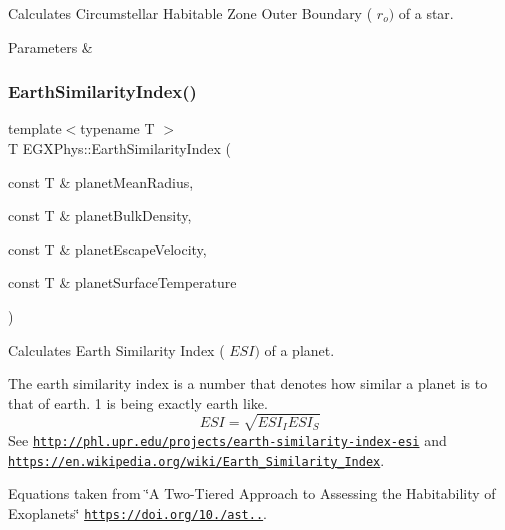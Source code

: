 Calculates Circumstellar Habitable Zone Outer Boundary ( $r_o)$ of a star. 


\begin{DoxyParams}{Parameters}
{\em } & \\
\hline
\end{DoxyParams}
\mbox{\label{group___astrophysics_ga4b86397b1c839c49ac599d49fda207d4}} 
\subsubsection{\texorpdfstring{Earth\+Similarity\+Index()}{EarthSimilarityIndex()}}
{\footnotesize\ttfamily template$<$typename T $>$ \\
T E\+G\+X\+Phys\+::\+Earth\+Similarity\+Index (\begin{DoxyParamCaption}\item[{const T \&}]{planet\+Mean\+Radius,  }\item[{const T \&}]{planet\+Bulk\+Density,  }\item[{const T \&}]{planet\+Escape\+Velocity,  }\item[{const T \&}]{planet\+Surface\+Temperature }\end{DoxyParamCaption})}



Calculates Earth Similarity Index ( $ESI)$ of a planet. 

The earth similarity index is a number that denotes how similar a planet is to that of earth. 1 is being exactly earth like. \[ESI=\sqrt{ESI_I ESI_S}\] See \href{http://phl.upr.edu/projects/earth-similarity-index-esi}{\tt http\+://phl.\+upr.\+edu/projects/earth-\/similarity-\/index-\/esi} and \href{https://en.wikipedia.org/wiki/Earth_Similarity_Index}{\tt https\+://en.\+wikipedia.\+org/wiki/\+Earth\+\_\+\+Similarity\+\_\+\+Index}.

Equations taken from \char`\"{}\+A Two-\/\+Tiered Approach to Assessing the Habitability of Exoplanets\char`\"{} \href{https://doi.org/10.1089/ast.2010.0592}{\tt https\+://doi.\+org/10./ast..}.


